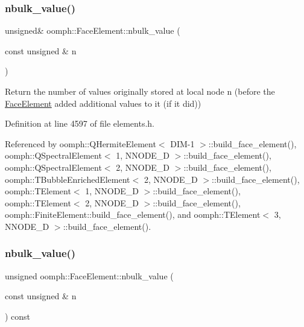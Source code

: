 \subsubsection{\texorpdfstring{nbulk\+\_\+value()}{nbulk\_value()}\hspace{0.1cm}{\footnotesize\ttfamily [1/2]}}
{\footnotesize\ttfamily unsigned\& oomph\+::\+Face\+Element\+::nbulk\+\_\+value (\begin{DoxyParamCaption}\item[{const unsigned \&}]{n }\end{DoxyParamCaption})\hspace{0.3cm}{\ttfamily [inline]}}



Return the number of values originally stored at local node n (before the \hyperlink{classoomph_1_1FaceElement}{Face\+Element} added additional values to it (if it did)) 



Definition at line 4597 of file elements.\+h.



Referenced by oomph\+::\+Q\+Hermite\+Element$<$ D\+I\+M-\/1 $>$\+::build\+\_\+face\+\_\+element(), oomph\+::\+Q\+Spectral\+Element$<$ 1, N\+N\+O\+D\+E\+\_\+D $>$\+::build\+\_\+face\+\_\+element(), oomph\+::\+Q\+Spectral\+Element$<$ 2, N\+N\+O\+D\+E\+\_\+D $>$\+::build\+\_\+face\+\_\+element(), oomph\+::\+T\+Bubble\+Enriched\+Element$<$ 2, N\+N\+O\+D\+E\+\_\+D $>$\+::build\+\_\+face\+\_\+element(), oomph\+::\+T\+Element$<$ 1, N\+N\+O\+D\+E\+\_\+D $>$\+::build\+\_\+face\+\_\+element(), oomph\+::\+T\+Element$<$ 2, N\+N\+O\+D\+E\+\_\+D $>$\+::build\+\_\+face\+\_\+element(), oomph\+::\+Finite\+Element\+::build\+\_\+face\+\_\+element(), and oomph\+::\+T\+Element$<$ 3, N\+N\+O\+D\+E\+\_\+D $>$\+::build\+\_\+face\+\_\+element().

\mbox{\label{classoomph_1_1FaceElement_a1045ac3ff9a56b0e4bd86b8e62f9d80c}} 
\subsubsection{\texorpdfstring{nbulk\+\_\+value()}{nbulk\_value()}\hspace{0.1cm}{\footnotesize\ttfamily [2/2]}}
{\footnotesize\ttfamily unsigned oomph\+::\+Face\+Element\+::nbulk\+\_\+value (\begin{DoxyParamCaption}\item[{const unsigned \&}]{n }\end{DoxyParamCaption}) const\hspace{0.3cm}{\ttfamily [inline]}}



